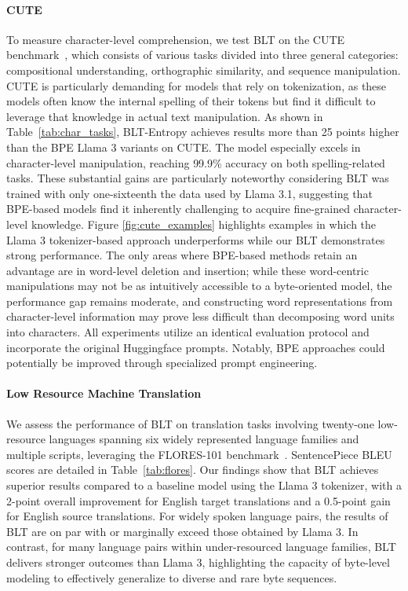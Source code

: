 \paragraph{CUTE}
To measure character-level comprehension, we test {\textsc BLT} on the CUTE benchmark~\citep{edman2024cute}, which consists of various tasks divided into three general categories: compositional understanding, orthographic similarity, and sequence manipulation. CUTE is particularly demanding for models that rely on tokenization, as these models often know the internal spelling of their tokens but find it difficult to leverage that knowledge in actual text manipulation. As shown in Table~\ref{tab:char_tasks}, {\textsc BLT}-Entropy achieves results more than 25 points higher than the BPE Llama 3 variants on CUTE. The model especially excels in character-level manipulation, reaching 99.9\% accuracy on both spelling-related tasks. These substantial gains are particularly noteworthy considering {\textsc BLT} was trained with only one-sixteenth the data used by Llama 3.1, suggesting that BPE-based models find it inherently challenging to acquire fine-grained character-level knowledge. Figure \ref{fig:cute_examples} highlights examples in which the Llama 3 tokenizer-based approach underperforms while our {\textsc BLT} demonstrates strong performance. The only areas where BPE-based methods retain an advantage are in word-level deletion and insertion; while these word-centric manipulations may not be as intuitively accessible to a byte-oriented model, the performance gap remains moderate, and constructing word representations from character-level information may prove less difficult than decomposing word units into characters. All experiments utilize an identical evaluation protocol and incorporate the original Huggingface prompts. Notably, BPE approaches could potentially be improved through specialized prompt engineering.

\paragraph{Low Resource Machine Translation} We assess the performance of {\textsc BLT} on translation tasks involving twenty-one low-resource languages spanning six widely represented language families and multiple scripts, leveraging the FLORES-101 benchmark~\citep{goyal2022flores}. SentencePiece BLEU scores are detailed in Table~\ref{tab:flores}. Our findings show that {\textsc BLT} achieves superior results compared to a baseline model using the Llama 3 tokenizer, with a 2-point overall improvement for English target translations and a 0.5-point gain for English source translations. For widely spoken language pairs, the results of {\textsc BLT} are on par with or marginally exceed those obtained by Llama 3. In contrast, for many language pairs within under-resourced language families, {\textsc BLT} delivers stronger outcomes than Llama 3, highlighting the capacity of byte-level modeling to effectively generalize to diverse and rare byte sequences.

